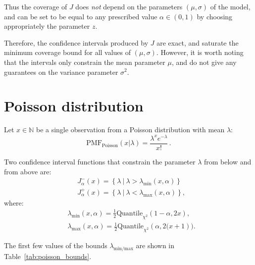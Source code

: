 \documentclass[11pt]{article}
\begin{document}
Thus the coverage of $J$ does \emph{not} depend on the parameters $(\mu,
\sigma)$ of the model, and can be set to be equal to any prescribed value
$\alpha \in (0, 1)$ by choosing appropriately the parameter $z$.

Therefore, the confidence intervals produced by $J$ are exact, and saturate the
minimum coverage bound for all values of $(\mu, \sigma)$. However, it is worth
noting that the intervals only constrain the mean parameter $\mu$, and do not
give any guarantees on the variance parameter $\sigma^2$.

\section{Poisson distribution}

Let $x \in \mathbb{N}$ be a single observation from a Poisson distribution with
mean $\lambda$:
\begin{equation}
    \mathrm{PMF}_{\mathrm{Poisson}}(x|\lambda) = 
    \frac{\lambda^x e^{-\lambda}}{x!}\,.
\end{equation}

Two confidence interval functions that constrain the parameter $\lambda$ from
below and from above are:
\begin{align}
    &J^{-}_{\alpha}(x) = \left\{\lambda\ |\
        \lambda > \lambda_{\mathrm{min}}(x, \alpha) \right\}\\
    &J^{+}_{\alpha}(x) = \left\{\lambda\ |\
        \lambda < \lambda_{\mathrm{max}}(x, \alpha) \right\},
\end{align}
where:
\begin{align}
    &\lambda_{\mathrm{min}}(x, \alpha) = \frac{1}{2}\mathrm{Quantile}_{\chi^2}
    \left(1 - \alpha, 2  x\right), \\
    &\lambda_{\mathrm{max}}(x, \alpha) = \frac{1}{2}\mathrm{Quantile}_{\chi^2}
    \left(\alpha, 2 (x + 1\right)).
\end{align}

The first few values of the bounds $\lambda_{\mathrm{min}/\mathrm{max}}$ are
shown in Table~\ref{tab:poisson_bounds}.
\end{document}
